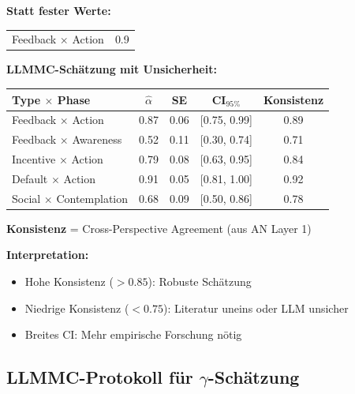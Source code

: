 \begin{tcolorbox}[colback=yellow!5!white, colframe=yellow!75!black,
    title=\textbf{Beispiel: LLMMC-geschätzte T5-Matrix (Type-Phase-Affinity)}]

\textbf{Statt fester Werte:}
\begin{center}
\begin{tabular}{@{}lc@{}}
Feedback $\times$ Action & 0.9 \\
\end{tabular}
\end{center}

\textbf{LLMMC-Schätzung mit Unsicherheit:}
\begin{center}
\renewcommand{\arraystretch}{1.2}
\begin{tabular}{@{}lcccc@{}}
\toprule
\textbf{Type $\times$ Phase} & $\hat{\alpha}$ & SE & CI$_{95\%}$ & \textbf{Konsistenz} \\
\midrule
Feedback $\times$ Action & 0.87 & 0.06 & [0.75, 0.99] & 0.89 \\
Feedback $\times$ Awareness & 0.52 & 0.11 & [0.30, 0.74] & 0.71 \\
Incentive $\times$ Action & 0.79 & 0.08 & [0.63, 0.95] & 0.84 \\
Default $\times$ Action & 0.91 & 0.05 & [0.81, 1.00] & 0.92 \\
Social $\times$ Contemplation & 0.68 & 0.09 & [0.50, 0.86] & 0.78 \\
\bottomrule
\end{tabular}
\end{center}

\textbf{Konsistenz} = Cross-Perspective Agreement (aus AN Layer 1)

\textbf{Interpretation:}
\begin{itemize}[nosep]
    \item Hohe Konsistenz ($> 0.85$): Robuste Schätzung
    \item Niedrige Konsistenz ($< 0.75$): Literatur uneins oder LLM unsicher
    \item Breites CI: Mehr empirische Forschung nötig
\end{itemize}

\end{tcolorbox}

\subsection{LLMMC-Protokoll für $\gamma$-Schätzung}


